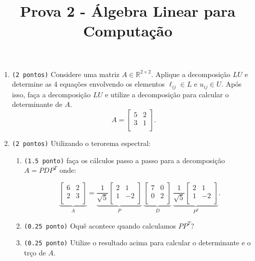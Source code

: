 \documentclass[a4paper,12pt]{article}
\title{Prova 2 - Álgebra Linear para Computação}
\date{}
\begin{document}
\maketitle
\vspace{-4em}
\begin{enumerate}
    \item \texttt{(2 pontos)} Considere uma matriz $A \in \mathbb{R}^{2\times 2}$. Aplique a decomposição $LU$ e determine as 4 equações envolvendo os elementos $\ell_{ij} \in L$ e $u_{ij} \in U$. Após isso, faça a decomposição $LU$ e utilize a decomposição para calcular o determinante de $A$.
    $$
    A = \begin{bmatrix}
        5 & 2 \\
        3 & 1  \\
    \end{bmatrix}.
    $$

    \item \texttt{(2 pontos)} Utilizando o terorema espectral:
    
    \begin{enumerate}
        \item \texttt{(1.5 ponto)} faça os cálculos passo a passo para a decomposição $A = P D P^T$ onde:
    
        $$
        \underbrace{\begin{bmatrix}
            6 & 2\\
            2 & 3\\
        \end{bmatrix}}_{A} =  \underbrace{\frac{1}{\sqrt{5}}\begin{bmatrix}
            2 & 1\\
            1 & -2\\
        \end{bmatrix}}_{P}\ \underbrace{\begin{bmatrix}
            7 & 0\\
            0 & 2\\
        \end{bmatrix}}_{D} \ \underbrace{\frac{1}{\sqrt{5}}\begin{bmatrix}
            2 & 1\\
            1 & -2\\
        \end{bmatrix}}_{P^T}.
        $$
        \item \texttt{(0.25 ponto)} Oquê acontece quando calculamos $P P^T$?
        \item \texttt{(0.25 ponto)} Utilize o resultado acima para calcular o determinante e o trço de $A$.
    \end{enumerate}
    


\end{enumerate}
\end{document}
